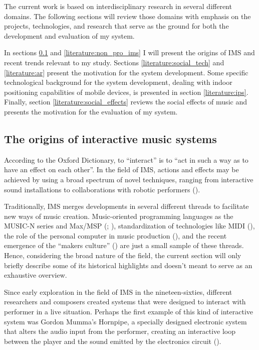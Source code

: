 \documentclass[a4paper,11pt]{article}
\begin{document}
The current work is based on interdisciplinary research in several different domains.
The following sections will review those domains with emphasis on the projects, technologies, and research that serve as the ground for both the development and evaluation of my system.

In sections \ref{literature:ims} and \ref{literature:non_pro_ims} I will present the origins of IMS and recent trends relevant to my study.
Sections \ref{literature:social_tech} and \ref{literature:ar} present the motivation for the system development.
Some specific technological background for the system development, dealing with indoor positioning capabilities of mobile devices, is presented in section \ref{literature:ips}.
Finally, section \ref{literature:social_effects} reviews the social effects of music and presents the motivation for the evaluation of my system.

\subsection{The origins of interactive music systems} \label{literature:ims}

According to the Oxford Dictionary, to ``interact'' is to ``act in such a way as to have an effect on each other''.
In the field of IMS, actions and effects may be achieved by using a broad spectrum of novel techniques, ranging from interactive sound installations to collaborations with robotic performers (\cite{drummond09}).

Traditionally, IMS merges developments in several different threads to facilitate new ways of music creation.
Music-oriented programming languages as the MUSIC-N series and Max/MSP (\cite{mathews69}; \cite[p. 16]{winkler01}), standardization of technologies like MIDI (\cite{web:quinn}), the role of the personal computer in music production (\cite{leider:04}), and the recent emergence of the ``makers culture'' (\cite{kuznetsov2010rise}) are just a small sample of these threads.
Hence, considering the broad nature of the field, the current section will only briefly describe some of its historical highlights and doesn't meant to serve as an exhaustive overview.

Since early exploration in the field of IMS in the nineteen-sixties, different researchers and composers created systems that were designed to interact with performer in a live situation.
Perhaps the first example of this kind of interactive system was Gordon Mumma's Hornpipe, a specially designed electronic system that alters the audio input from the performer, creating an interactive loop between the player and the sound emitted by the electronics circuit (\cite[p. 12]{winkler01}).
\end{document}
